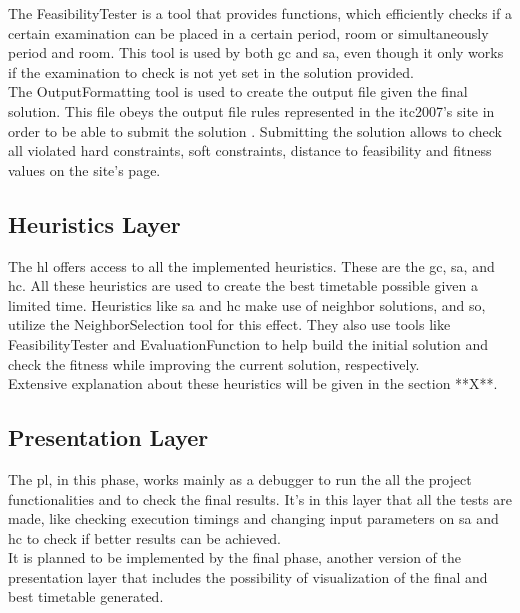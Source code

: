 The FeasibilityTester is a tool that provides functions, which efficiently checks if a certain examination can be placed in a certain period, room or simultaneously period and room. This tool is used by both \gls{gc} and \gls{sa}, even though it only works if the examination to check is not yet set in the solution provided.\\

The OutputFormatting tool is used to create the output file given the final solution. This file obeys the output file rules represented in the \gls{itc2007}'s site \cite{McCollum2007b} in order to be able to submit the solution \cite{McCollum2007c}. Submitting the solution allows to check all violated hard constraints, soft constraints, distance to feasibility and fitness values on the site's page.

\subsection{Heuristics Layer}

The \gls{hl} offers access to all the implemented heuristics. These are the \gls{gc}, \gls{sa}, and \gls{hc}. All these heuristics are used to create the best timetable possible given a limited time. Heuristics like \gls{sa} and \gls{hc} make use of neighbor solutions, and so, utilize the NeighborSelection tool for this effect. They also use tools like FeasibilityTester and EvaluationFunction to help build the initial solution and check the fitness while improving the current solution, respectively.\\

Extensive explanation about these heuristics will be given in the {\color{red}section **X**}.

\subsection{Presentation Layer}

The \gls{pl}, in this phase, works mainly as a debugger to run the all the project functionalities and to check the final results. It's in this layer that all the tests are made, like checking execution timings and changing input parameters on \gls{sa} and \gls{hc} to check if better results can be achieved.\\

It is planned to be implemented by the final phase, another version of the presentation layer that includes the possibility of visualization of the final and best timetable generated.













